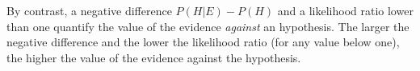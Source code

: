 \documentclass[10pt]{article}
\begin{document}
%

 By contrast, a negative difference $P(H | E) - P(H)$ and a likelihood ratio lower than one  
quantify the value of the evidence \textit{against} an hypothesis.
The larger the negative difference and the lower the likelihood ratio (for any value below one), 
the higher the value of the evidence against the hypothesis.

\end{document}
